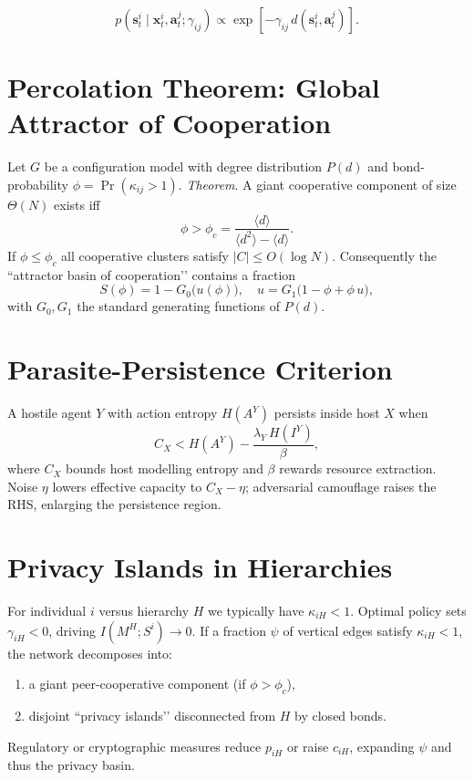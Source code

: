 \documentclass[10pt,conference]{IEEEtran}
\newcommand{\hstate}{\mathbf x}        %
\newcommand{\obs}{\mathbf s}           %
\newcommand{\act}{\mathbf a}           %
\newcommand{\precision}{\gamma}        %
\begin{document}
\[
p(\obs^i_t\mid\hstate^i_t,\act^j_t;\precision_{ij})\propto
\exp[-\precision_{ij}\,d(\obs^i_t,\act^j_t)].
\]

\section{Percolation Theorem: Global Attractor of Cooperation}

Let \(G\) be a configuration model with degree distribution \(P(d)\) and bond-probability \(\phi=\Pr(\kappa_{ij}>1)\).  
\emph{Theorem}.  A giant cooperative component of size \(\Theta(N)\) exists iff
\[
\phi>\phi_c=\frac{\langle d\rangle}{\langle d^2\rangle-\langle d\rangle}.
\]
If \(\phi\le\phi_c\) all cooperative clusters satisfy \(|C|\le O(\log N)\).  
Consequently the “attractor basin of cooperation’’ contains a fraction
\[
S(\phi)=1-G_0\!\bigl(u(\phi)\bigr),
\quad
u=G_1\!\bigl(1-\phi+\phi\,u\bigr),
\]
with \(G_0,G_1\) the standard generating functions of \(P(d)\).

\section{Parasite-Persistence Criterion}

A hostile agent \(Y\) with action entropy \(H(A^Y)\) persists inside host \(X\) when
\[
C_X < H(A^Y)-\frac{\lambda_Y\,H(I^Y)}{\beta},
\]
where \(C_X\) bounds host modelling entropy and \(\beta\) rewards resource extraction.  
Noise \(\eta\) lowers effective capacity to \(C_X-\eta\); adversarial camouflage raises the RHS, enlarging the persistence region.

\section{Privacy Islands in Hierarchies}

For individual \(i\) versus hierarchy \(H\) we typically have \(\kappa_{iH}<1\).  
Optimal policy sets \(\gamma_{iH}<0\), driving \(I(M^H;S^i)\!\to\!0\).  
If a fraction \(\psi\) of vertical edges satisfy \(\kappa_{iH}<1\), the network decomposes into:
\begin{enumerate}
\item a giant peer-cooperative component (if \(\phi>\phi_c\)),
\item disjoint “privacy islands’’ disconnected from \(H\) by closed bonds.
\end{enumerate}
Regulatory or cryptographic measures reduce \(p_{iH}\) or raise \(c_{iH}\), expanding \(\psi\) and thus the privacy basin.
\end{document}
